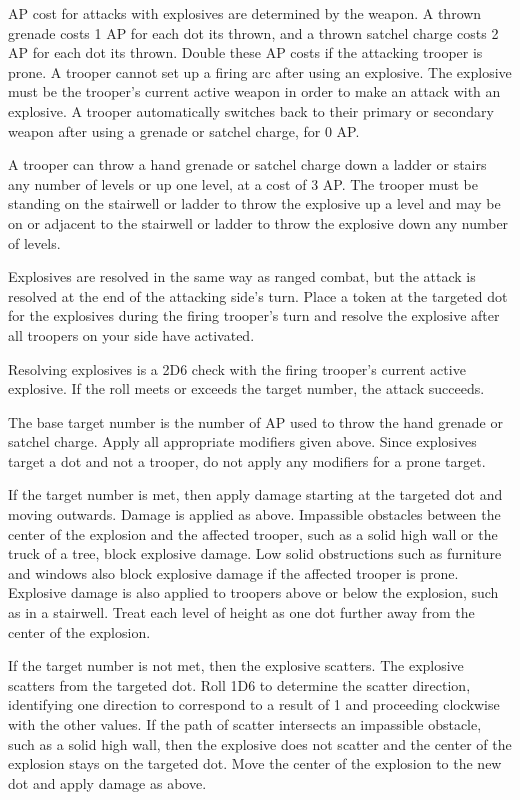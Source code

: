AP cost for attacks with explosives are determined by the weapon.
A thrown grenade costs 1 AP for each dot its thrown, and a thrown satchel charge costs 2 AP for each dot its thrown.
Double these AP costs if the attacking trooper is prone.
A trooper cannot set up a firing arc after using an explosive.
The explosive must be the trooper's current active weapon in order to make an attack with an explosive.
A trooper automatically switches back to their primary or secondary weapon after using a grenade or satchel charge, for 0 AP.

A trooper can throw a hand grenade or satchel charge down a ladder or stairs any number of levels or up one level, at a cost of 3 AP.
The trooper must be standing on the stairwell or ladder to throw the explosive up a level and may be on or adjacent to the stairwell or ladder to throw the explosive down any number of levels.

Explosives are resolved in the same way as ranged combat, but the attack is resolved at the end of the attacking side's turn.
Place a token at the targeted dot for the explosives during the firing trooper's turn and resolve the explosive after all troopers on your side have activated.

Resolving explosives is a 2D6 check with the firing trooper's current active explosive.
If the roll meets or exceeds the target number, the attack succeeds.

The base target number is the number of AP used to throw the hand grenade or satchel charge.
Apply all appropriate modifiers given above.
Since explosives target a dot and not a trooper, do not apply any modifiers for a prone target.

If the target number is met, then apply damage starting at the targeted dot and moving outwards.
Damage is applied as above.
Impassible obstacles between the center of the explosion and the affected trooper, such as a solid high wall or the truck of a tree, block explosive damage.
Low solid obstructions such as furniture and windows also block explosive damage if the affected trooper is prone.
Explosive damage is also applied to troopers above or below the explosion, such as in a stairwell.
Treat each level of height as one dot further away from the center of the explosion.

If the target number is not met, then the explosive scatters.
The explosive scatters from the targeted dot.
Roll 1D6 to determine the scatter direction, identifying one direction to correspond to a result of 1 and proceeding clockwise with the other values.
If the path of scatter intersects an impassible obstacle, such as a solid high wall, then the explosive does not scatter and the center of the explosion stays on the targeted dot.
Move the center of the explosion to the new dot and apply damage as above.
